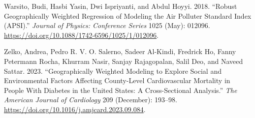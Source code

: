 \documentclass[
]{article}
\newlength{\cslhangindent}
\newenvironment{CSLReferences}[2] %
 {\begin{list}{}{%
  \setlength{\itemindent}{0pt}
  \setlength{\leftmargin}{0pt}
  \setlength{\parsep}{0pt}
  \ifodd #1
   \setlength{\leftmargin}{\cslhangindent}
   \setlength{\itemindent}{-1\cslhangindent}
  \fi
  \setlength{\itemsep}{#2\baselineskip}}}
 {\end{list}}
\begin{document}
\begin{CSLReferences}{1}{0}
Warsito, Budi, Hasbi Yasin, Dwi Ispriyanti, and Abdul Hoyyi. 2018.
{``Robust Geographically Weighted Regression of Modeling the {Air}
{Polluter} {Standard} {Index} ({APSI}).''} \emph{Journal of Physics:
Conference Series} 1025 (May): 012096.
\url{https://doi.org/10.1088/1742-6596/1025/1/012096}.

Zelko, Andrea, Pedro R. V. O. Salerno, Sadeer Al-Kindi, Fredrick Ho,
Fanny Petermann Rocha, Khurram Nasir, Sanjay Rajagopalan, Salil Deo, and
Naveed Sattar. 2023. {``Geographically {Weighted} {Modeling} to
{Explore} {Social} and {Environmental} {Factors} {Affecting}
{County}-{Level} {Cardiovascular} {Mortality} in {People} {With}
{Diabetes} in the {United} {States}: {A} {Cross}-{Sectional}
{Analysis}.''} \emph{The American Journal of Cardiology} 209 (December):
193--98. \url{https://doi.org/10.1016/j.amjcard.2023.09.084}.

\end{CSLReferences}
\end{document}
